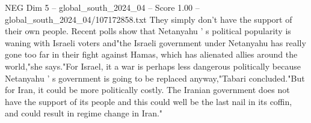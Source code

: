 \begin{textsample}{NEG Dim 5 – global\_south\_2024\_04 – Score 1.00 – global\_south\_2024\_04/107172858.txt}
They simply don't have the support of their own people.
Recent polls show that Netanyahu ' s political popularity is waning with Israeli voters and"the Israeli government under Netanyahu has really gone too far in their fight against Hamas, which has alienated allies around the world,"she says."For Israel, it a war is perhaps less dangerous politically because Netanyahu ' s government is going to be replaced anyway,"Tabari concluded."But for Iran, it could be more politically costly.
The Iranian government does not have the support of its people and this could well be the last nail in its coffin, and could result in regime change in Iran."

\end{textsample}
